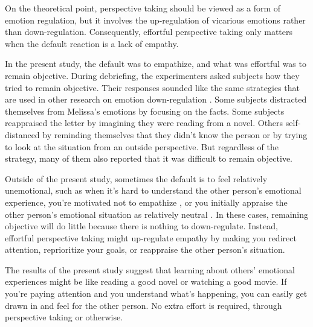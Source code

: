 \documentclass[man,a4paper,noextraspace,apacite]{apa6}\usepackage[]{graphicx}\usepackage[]{color}
\begin{document}
On the theoretical point, perspective taking should be viewed as a form of emotion regulation, but it involves the up-regulation of vicarious emotions rather than down-regulation. Consequently, effortful perspective taking only matters when the default reaction is a lack of empathy. 

In the present study, the default was to empathize, and what was effortful was to remain objective. During debriefing, the experimenters asked subjects how they tried to remain objective. Their responses sounded like the same strategies that are used in other research on emotion down-regulation \cite{Gross2015, Kross2011}. Some subjects distracted themselves from Melissa's emotions by focusing on the facts. Some subjects reappraised the letter by imagining they were reading from a novel. Others self-distanced by reminding themselves that they didn't know the person or by trying to look at the situation from an outside perspective. But regardless of the strategy, many of them also reported that it was difficult to remain objective.

Outside of the present study, sometimes the default is to feel relatively unemotional, such as when it's hard to understand the other person's emotional experience, you're motivated not to empathize \cite{Zaki2014}, or you initially appraise the other person's emotional situation as relatively neutral \cite{Wondra2015}. In these cases, remaining objective will do little because there is nothing to down-regulate. Instead, effortful perspective taking might up-regulate empathy by making you redirect attention, reprioritize your goals, or reappraise the other person's situation. 

The results of the present study suggest that learning about others' emotional experiences might be like reading a good novel or watching a good movie. If you're paying attention and you understand what's happening, you can easily get drawn in and feel for the other person. No extra effort is required, through perspective taking or otherwise.



\end{document}
